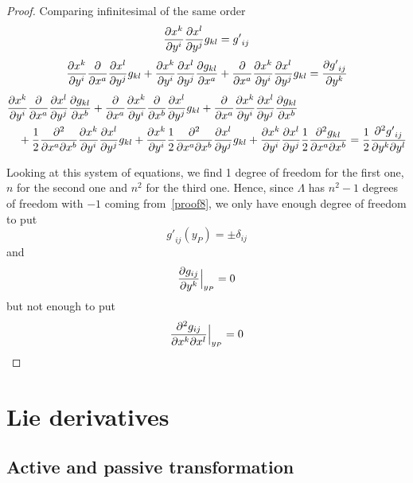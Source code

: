 \begin{proof}
        Comparing infinitesimal of the same order
        \begin{equation*}
            \frac{\partial x^k}{\partial y^i} \frac{\partial x^l}{\partial y^j} g_{kl} = {g'}_{ij}
        \end{equation*}
        \begin{equation*}
            \frac{\partial x^k}{\partial y^i} \frac{\partial}{\partial x^a} \frac{\partial x^l}{\partial y^j} g_{kl} + \frac{\partial x^k}{\partial y^i} \frac{\partial x^l}{\partial y^j} \frac{\partial g_{kl}}{\partial x^a} + \frac{\partial}{\partial x^a} \frac{\partial x^k}{\partial y^i} \frac{\partial x^l}{\partial y^j} g_{kl} = \frac{\partial{g'}_{ij}}{\partial y^k}
        \end{equation*}
        \begin{equation*}
        \begin{aligned}
            & \frac{\partial x^k}{\partial y^i} \frac{\partial}{\partial x^a} \frac{\partial x^l}{\partial y^j} \frac{\partial g_{kl}}{\partial x^b}
            + \frac{\partial}{\partial x^a} \frac{\partial x^k}{\partial y^i}\frac{\partial}{\partial x^b} \frac{\partial x^l}{\partial y^j} g_{kl}
            + \frac{\partial}{\partial x^a} \frac{\partial x^k}{\partial y^i} \frac{\partial x^l}{\partial y^j} \frac{\partial g_{kl}}{\partial x^b} \\ & \quad + \frac{1}{2} \frac{\partial^2 }{\partial x^a \partial x^b} \frac{\partial x^k}{\partial y^i} \frac{\partial x^l}{\partial y^j} g_{kl} 
            + \frac{\partial x^k}{\partial y^i} \frac{1}{2} \frac{\partial^2 }{\partial x^a \partial x^b} \frac{\partial x^l}{\partial y^j} g_{kl}
            + \frac{\partial x^k}{\partial y^i} \frac{\partial x^l}{\partial y^j} \frac{1}{2} \frac{\partial^2 g_{kl}}{\partial x^a \partial x^b} = \frac{1}{2} \frac{\partial^2 {g'}_{ij}}{\partial y^k \partial y^l}
        \end{aligned}
        \end{equation*}

        Looking at this system of equations, we find 1 degree of freedom for the first one, $n$ for the second one and $n^2$ for the third one. Hence, since $\Lambda$ has $n^2 - 1$ degrees of freedom with $-1$ coming from~\eqref{proof8}, we only have enough degree of freedom to put 
        \begin{equation*}
            {g'}_{ij} (y_P) = \pm \delta_{ij}
        \end{equation*}
        and 
        \begin{equation*}
            \frac{\partial g_{ij}}{\partial y^k} \Big\vert_{y_P} = 0
        \end{equation*}
        but not enough to put 
        \begin{equation*}
            \frac{\partial^2 g_{ij}}{\partial x^k \partial x^l} \Big\vert_{y_P} = 0
        \end{equation*}
    \end{proof}

\chapter{Lie derivatives}

\section{Active and passive transformation}

